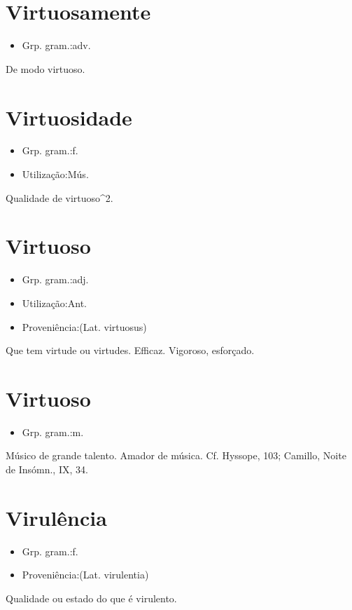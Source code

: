 \documentclass{article}
\begin{document}
\section{Virtuosamente}
\begin{itemize}
\item {Grp. gram.:adv.}
\end{itemize}
De modo virtuoso.
\section{Virtuosidade}
\begin{itemize}
\item {Grp. gram.:f.}
\end{itemize}
\begin{itemize}
\item {Utilização:Mús.}
\end{itemize}
Qualidade de virtuoso^2.
\section{Virtuoso}
\begin{itemize}
\item {Grp. gram.:adj.}
\end{itemize}
\begin{itemize}
\item {Utilização:Ant.}
\end{itemize}
\begin{itemize}
\item {Proveniência:(Lat. \textunderscore virtuosus\textunderscore )}
\end{itemize}
Que tem virtude ou virtudes.
Efficaz.
Vigoroso, esforçado.
\section{Virtuoso}
\begin{itemize}
\item {Grp. gram.:m.}
\end{itemize}
Músico de grande talento.
Amador de música. Cf. \textunderscore Hyssope\textunderscore , 103; Camillo, \textunderscore Noite de Insómn.\textunderscore , IX, 34.
\section{Virulência}
\begin{itemize}
\item {Grp. gram.:f.}
\end{itemize}
\begin{itemize}
\item {Proveniência:(Lat. \textunderscore virulentia\textunderscore )}
\end{itemize}
Qualidade ou estado do que é virulento.
\end{document}
